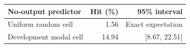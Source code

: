 \begin{tabular}{lrr}
\toprule
No-output predictor & Hit (\%) & 95\% interval \\
\midrule
Uniform random cell & 1.56 & Exact expectation \\
Development modal cell & 14.94 & [8.67, 22.51] \\
\bottomrule
\end{tabular}
